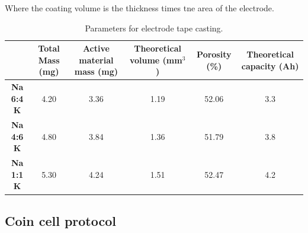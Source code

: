\documentclass{article}
\begin{document}
\begin{itemize}
\begin{itemize}
\begin{center}
  \end{center}
    Where the  coating volume is the thickness times tne area of the electrode. 
  \end{itemize}
  
\end{itemize}
\begin{table}[h!]
  \centering
  \begin{adjustbox}{width=1\textwidth}
  \small
  \begin{tabular}{|c|c|c|c|c|c|}
    \hline
    & \textbf{Total Mass (mg)} & \textbf{Active material mass (mg)} & \textbf{Theoretical volume (mm$^3$)} & \textbf{Porosity (\%)} & \textbf{Theoretical capacity (Ah)} \\ 
    \hline
    \textbf{Na 6:4 K} & 4.20 & 3.36 & 1.19 & 52.06 & 3.3 \\ 
    \hline
    \textbf{Na 4:6 K} & 4.80 & 3.84 & 1.36 & 51.79 & 3.8 \\ 
    \hline
    \textbf{Na 1:1 K} & 5.30 & 4.24 & 1.51 & 52.47 & 4.2 \\ 
    \hline
  \end{tabular}
  \end{adjustbox}
  \caption{Parameters for electrode tape casting.}
  \label{t3}
\end{table}
\subsection{Coin cell protocol}
\end{document}
